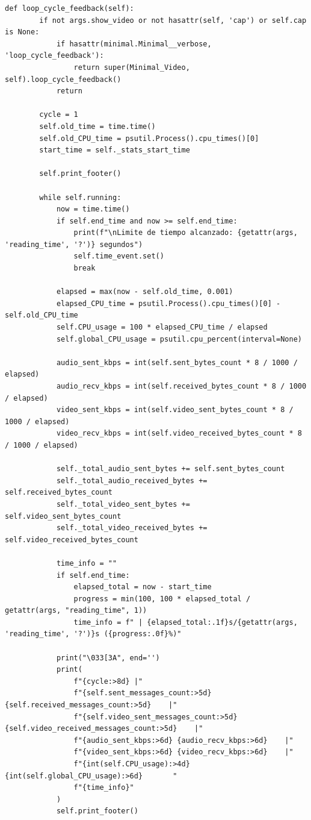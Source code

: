 \begin{lstlisting}[style=pythonstyle, caption={Método \texttt{loop\_cycle\_feedback()} de \textit{Minimal\_Video\_verbose}.}, label={lst:loop_cycle_feedback_minimal_video_verbose}]
def loop_cycle_feedback(self):
        if not args.show_video or not hasattr(self, 'cap') or self.cap is None:
            if hasattr(minimal.Minimal__verbose, 'loop_cycle_feedback'):
                return super(Minimal_Video, self).loop_cycle_feedback()
            return

        cycle = 1
        self.old_time = time.time()
        self.old_CPU_time = psutil.Process().cpu_times()[0]
        start_time = self._stats_start_time

        self.print_footer()

        while self.running:
            now = time.time()
            if self.end_time and now >= self.end_time:
                print(f"\nLimite de tiempo alcanzado: {getattr(args, 'reading_time', '?')} segundos")
                self.time_event.set()
                break

            elapsed = max(now - self.old_time, 0.001)
            elapsed_CPU_time = psutil.Process().cpu_times()[0] - self.old_CPU_time
            self.CPU_usage = 100 * elapsed_CPU_time / elapsed
            self.global_CPU_usage = psutil.cpu_percent(interval=None)

            audio_sent_kbps = int(self.sent_bytes_count * 8 / 1000 / elapsed)
            audio_recv_kbps = int(self.received_bytes_count * 8 / 1000 / elapsed)
            video_sent_kbps = int(self.video_sent_bytes_count * 8 / 1000 / elapsed)
            video_recv_kbps = int(self.video_received_bytes_count * 8 / 1000 / elapsed)

            self._total_audio_sent_bytes += self.sent_bytes_count
            self._total_audio_received_bytes += self.received_bytes_count
            self._total_video_sent_bytes += self.video_sent_bytes_count
            self._total_video_received_bytes += self.video_received_bytes_count

            time_info = ""
            if self.end_time:
                elapsed_total = now - start_time
                progress = min(100, 100 * elapsed_total / getattr(args, "reading_time", 1))
                time_info = f" | {elapsed_total:.1f}s/{getattr(args, 'reading_time', '?')}s ({progress:.0f}%)"

            print("\033[3A", end='')
            print(
                f"{cycle:>8d} |"
                f"{self.sent_messages_count:>5d} {self.received_messages_count:>5d}    |"
                f"{self.video_sent_messages_count:>5d} {self.video_received_messages_count:>5d}    |"
                f"{audio_sent_kbps:>6d} {audio_recv_kbps:>6d}    |"
                f"{video_sent_kbps:>6d} {video_recv_kbps:>6d}    |"
                f"{int(self.CPU_usage):>4d} {int(self.global_CPU_usage):>6d}       "
                f"{time_info}"
            )
            self.print_footer()


\end{lstlisting}
